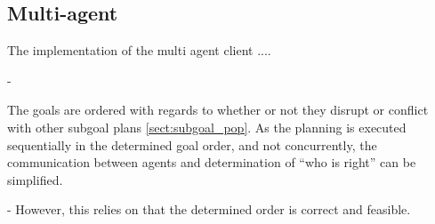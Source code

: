 \documentclass[Main]{subfiles}
\begin{document}


\subsection{Multi-agent} 

The implementation of the multi agent client  .... 

- 

The goals are ordered with regards to whether or not they disrupt or conflict with other subgoal plans \cref{sect:subgoal_pop}. As the planning is executed sequentially in the determined goal order, and not concurrently, the communication between agents and determination of ``who is right'' can be simplified. 


- However, this relies on that the determined order is correct and feasible.
\end{document}
